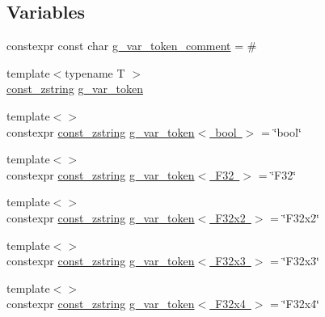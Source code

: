 \subsection*{Variables}
\begin{DoxyCompactItemize}
\item 
constexpr const char \mbox{\hyperlink{namespacemage_1_1loader_a51fd34b486dfe1d203f7c7b897b2fd2c}{g\+\_\+var\+\_\+token\+\_\+comment}} = \textquotesingle{}\#\textquotesingle{}
\item 
{\footnotesize template$<$typename T $>$ }\\\mbox{\hyperlink{namespacemage_abfd9206dc607ceb5d13ec68bf075a5c0}{const\+\_\+zstring}} \mbox{\hyperlink{namespacemage_1_1loader_af955278eb72ed57ce15bc79d4d074b3a}{g\+\_\+var\+\_\+token}}
\item 
{\footnotesize template$<$$>$ }\\constexpr \mbox{\hyperlink{namespacemage_abfd9206dc607ceb5d13ec68bf075a5c0}{const\+\_\+zstring}} \mbox{\hyperlink{namespacemage_1_1loader_a9cd6293d10a4878b3cb6947501c4fea6}{g\+\_\+var\+\_\+token$<$ bool $>$}} = \char`\"{}bool\char`\"{}
\item 
{\footnotesize template$<$$>$ }\\constexpr \mbox{\hyperlink{namespacemage_abfd9206dc607ceb5d13ec68bf075a5c0}{const\+\_\+zstring}} \mbox{\hyperlink{namespacemage_1_1loader_ac4d75ba515c1934351afc66e069606a7}{g\+\_\+var\+\_\+token$<$ F32 $>$}} = \char`\"{}F32\char`\"{}
\item 
{\footnotesize template$<$$>$ }\\constexpr \mbox{\hyperlink{namespacemage_abfd9206dc607ceb5d13ec68bf075a5c0}{const\+\_\+zstring}} \mbox{\hyperlink{namespacemage_1_1loader_af56b628989892c30ef0ce2c616bd424f}{g\+\_\+var\+\_\+token$<$ F32x2 $>$}} = \char`\"{}F32x2\char`\"{}
\item 
{\footnotesize template$<$$>$ }\\constexpr \mbox{\hyperlink{namespacemage_abfd9206dc607ceb5d13ec68bf075a5c0}{const\+\_\+zstring}} \mbox{\hyperlink{namespacemage_1_1loader_a96f6bd7e12009e96e1194ff6e1a7ed22}{g\+\_\+var\+\_\+token$<$ F32x3 $>$}} = \char`\"{}F32x3\char`\"{}
\item 
{\footnotesize template$<$$>$ }\\constexpr \mbox{\hyperlink{namespacemage_abfd9206dc607ceb5d13ec68bf075a5c0}{const\+\_\+zstring}} \mbox{\hyperlink{namespacemage_1_1loader_a2f4e759baaf1713c41722c8332ff85f0}{g\+\_\+var\+\_\+token$<$ F32x4 $>$}} = \char`\"{}F32x4\char`\"{}
\item 

\end{DoxyCompactItemize}
